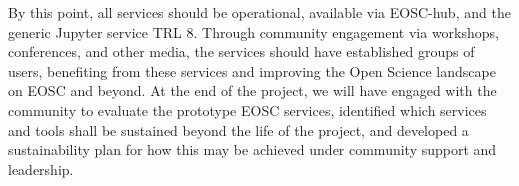 \begin{milestones}
  {
  By this point, all \TheProject services should be operational, available via EOSC-hub,
  and the generic Jupyter service TRL 8.
  Through community engagement via workshops, conferences, and other media,
  the services should have established groups of users,
  benefiting from these services and improving the Open Science landscape
  on EOSC and beyond.
  At the end of the project,
  we will have engaged with the community to evaluate
  the prototype EOSC services,
  identified which services and tools shall be sustained beyond the life of the project,
  and developed a sustainability plan for
  how this may be achieved under community support and leadership.
  }

\end{milestones}
